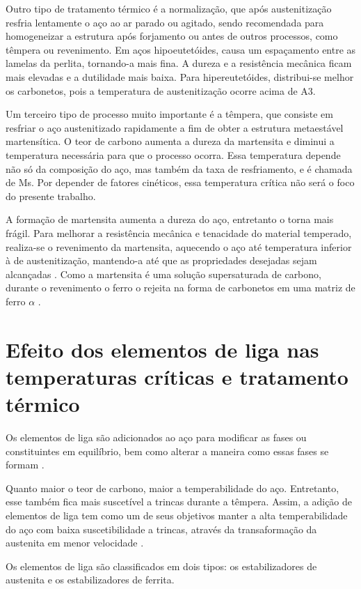 \documentclass[brazil,tese,epusp]{usp}
\begin{document}
Outro tipo de tratamento térmico é a normalização, que após austenitização resfria lentamente o aço ao ar parado ou agitado, sendo recomendada para homogeneizar a estrutura após forjamento ou antes de outros processos, como têmpera ou revenimento. Em aços hipoeutetóides, causa um espaçamento entre as lamelas da perlita, tornando-a mais fina. A dureza e a resistência mecânica ficam mais elevadas e a dutilidade mais baixa. Para hipereutetóides, distribui-se melhor os carbonetos, pois a temperatura de austenitização ocorre acima de A3.

Um terceiro tipo de processo muito importante é a têmpera, que consiste em resfriar o aço austenitizado rapidamente a fim de obter a estrutura metaestável martensítica. O teor de carbono aumenta a dureza da martensita e diminui a temperatura necessária para que o processo ocorra. Essa temperatura depende não só da composição do aço, mas também da taxa de resfriamento, e é chamada de Ms. Por depender de fatores cinéticos, essa temperatura crítica não será o foco do presente trabalho.

A formação de martensita aumenta a dureza do aço, entretanto o torna mais frágil. Para  melhorar a resistência mecânica e tenacidade do material temperado, realiza-se o revenimento da martensita, aquecendo o aço até temperatura inferior à de austenitização, mantendo-a até que as propriedades desejadas sejam alcançadas \cite{Silva2010}. Como a martensita é uma solução supersaturada de carbono, durante o revenimento o ferro o rejeita na forma de carbonetos em uma matriz de ferro $\alpha$ \cite{Honeycombe1982}.

\section{Efeito dos elementos de liga nas temperaturas críticas e tratamento térmico}
Os elementos de liga são adicionados ao aço para modificar as fases ou constituintes em equilíbrio, bem como alterar a maneira como essas fases se formam \cite{Silva2010}.

Quanto maior o teor de carbono, maior a temperabilidade do aço. Entretanto, esse também fica mais suscetível a trincas durante a têmpera. Assim, a adição de elementos de liga tem como um de seus objetivos manter a alta temperabilidade do aço com baixa suscetibilidade a trincas, através da transaformação da austenita em menor velocidade \cite{Souza1989}.

Os elementos de liga são classificados em dois tipos: os estabilizadores de austenita e os estabilizadores de ferrita.  
\end{document}

